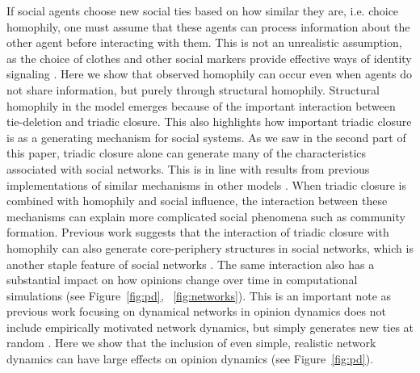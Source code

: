 \documentclass[11pt]{article}
\begin{document}
If social agents choose new social ties based on how similar they are, i.e. choice homophily, one must assume that these agents can process information about the other agent before interacting with them. This is not an unrealistic assumption, as the choice of clothes and other social markers provide effective ways of identity signaling \cite{smaldino_models_2022}. Here we show that observed homophily can occur even when agents do not share information, but purely through structural homophily. Structural homophily in the model emerges because of the important interaction between tie-deletion and triadic closure. This also highlights how important triadic closure is as a generating mechanism for social systems. As we saw in the second part of this paper, triadic closure alone can generate many of the characteristics associated with social networks. This is in line with results from previous implementations of similar mechanisms in other models \cite{jacksonsearch2004, jacksonmeeting2007}. When triadic closure is combined with homophily and social influence, the interaction between these mechanisms can explain more complicated social phenomena such as community formation. Previous work suggests that the interaction of triadic closure with homophily can also generate core-periphery structures in social networks, which is another staple feature of social networks \cite{asikainen_cumulative_2020}. The same interaction also has a substantial impact on how opinions change over time in computational simulations (see Figure~\ref{fig:pd}, ~\ref{fig:networks}). This is an important note as previous work focusing on dynamical networks in opinion dynamics does not include empirically motivated network dynamics, but simply generates new ties at random \cite{kozma2008consensus}. Here we show that the inclusion of even simple, realistic network dynamics can have large effects on opinion dynamics (see Figure~\ref{fig:pd}). 
\end{document}
